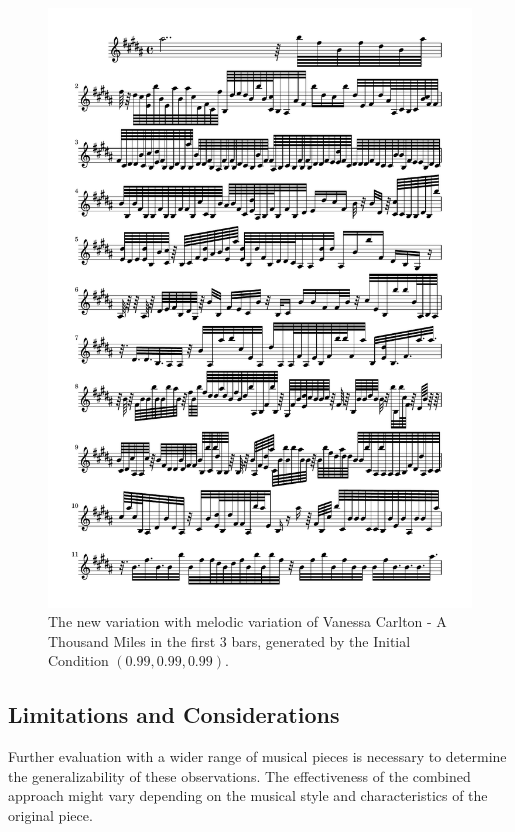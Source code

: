 \documentclass[11pt]{article}
\begin{document}
\begin{figure}
\centering
\includegraphics[trim=1cm 21.5cm 1cm 0.5cm, clip, scale=0.6]{New_ATM.pdf}
\caption{The new variation with melodic variation of Vanessa Carlton - A Thousand Miles in the first 3 bars, generated by the Initial Condition $(0.99, 0.99, 0.99)$.} 
\label{fig:NATM}
\end{figure}

\subsection{Limitations and Considerations}

Further evaluation with a wider range of musical pieces is necessary to determine the generalizability of these observations. The effectiveness of the combined approach might vary depending on the musical style and characteristics of the original piece.
\end{document}

